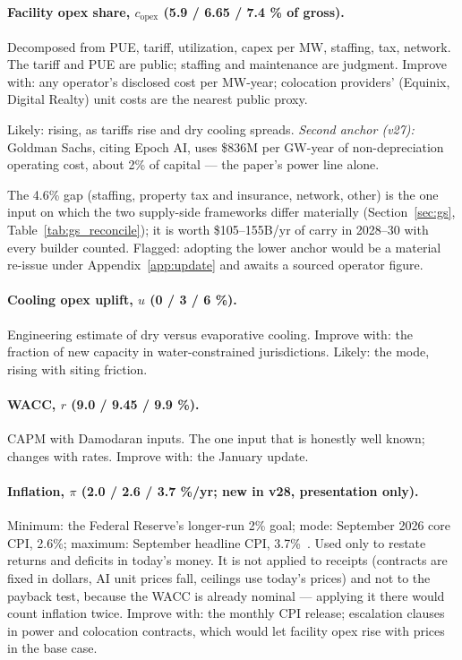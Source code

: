 \documentclass[11pt,letterpaper]{article}
\begin{document}
\paragraph{Facility opex share, $c_{\text{opex}}$ (5.9 / 6.65 / 7.4 \% of gross).} Decomposed from PUE, tariff, utilization, capex per MW, staffing, tax, network. The tariff and PUE are public; staffing and maintenance are judgment. Improve with: any operator's disclosed cost per MW-year; colocation providers' (Equinix, Digital Realty) unit costs are the nearest public proxy.

Likely: rising, as tariffs rise and dry cooling spreads. \emph{Second anchor (v27):} Goldman Sachs, citing Epoch AI, uses \$836M per GW-year of non-depreciation operating cost, about 2\% of capital --- the paper's power line alone.

The 4.6\% gap (staffing, property tax and insurance, network, other) is the one input on which the two supply-side frameworks differ materially (Section~\ref{sec:gs}, Table~\ref{tab:gs_reconcile}); it is worth \$105--155B/yr of carry in 2028--30 with every builder counted. Flagged: adopting the lower anchor would be a material re-issue under Appendix~\ref{app:update} and awaits a sourced operator figure.

\paragraph{Cooling opex uplift, $u$ (0 / 3 / 6 \%).} Engineering estimate of dry versus evaporative cooling. Improve with: the fraction of new capacity in water-constrained jurisdictions. Likely: the mode, rising with siting friction.

\paragraph{WACC, $r$ (9.0 / 9.45 / 9.9 \%).} CAPM with Damodaran inputs. The one input that is honestly well known; changes with rates. Improve with: the January update.

\paragraph{Inflation, $\pi$ (2.0 / 2.6 / 3.7 \%/yr; new in v28, presentation only).} Minimum: the Federal Reserve's longer-run 2\% goal; mode: September 2026 core CPI, 2.6\%; maximum: September headline CPI, 3.7\%~\cite{ref:fed_goal,ref:bls_cpi_sep26}. Used only to restate returns and deficits in today's money. It is not applied to receipts (contracts are fixed in dollars, AI unit prices fall, ceilings use today's prices) and not to the payback test, because the WACC is already nominal --- applying it there would count inflation twice. Improve with: the monthly CPI release; escalation clauses in power and colocation contracts, which would let facility opex rise with prices in the base case.
\end{document}
